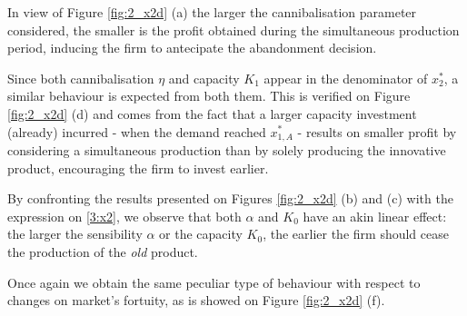 In view of Figure \ref{fig:2_x2d} (a) the larger the cannibalisation parameter considered, the smaller is the profit obtained during the simultaneous production period, inducing the firm to antecipate the abandonment decision. 

Since both cannibalisation $\eta$ and capacity $K_1$ appear in the denominator of $x^*_2$, a similar behaviour is expected from both them. This is verified on Figure \ref{fig:2_x2d} (d) and comes from the fact that a larger capacity investment (already) incurred - when the demand reached $x^*_{1,A}$ - results on smaller profit by considering a simultaneous production than by solely producing the innovative product, encouraging the firm to invest earlier.

By confronting the results presented on Figures \ref{fig:2_x2d} (b) and (c) with the expression on \eqref{3:x2}, we observe that both $\alpha$ and $K_0$ have an akin linear effect: the larger the sensibility $\alpha$ or the capacity $K_0$, the earlier the firm should cease the production of the \textit{old} product.

Once again we obtain the same peculiar type of behaviour with respect to changes on market's fortuity, as is showed on Figure \ref{fig:2_x2d} (f).




